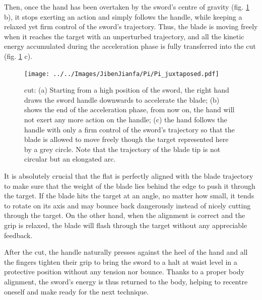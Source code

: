 Then, once the hand has been overtaken by the sword's centre of gravity (fig. \ref{fig:pi_cut} b), it stops exerting an action and simply follows the handle, while keeping a relaxed yet firm control of the sword's trajectory. Thus, the blade is moving freely when it reaches the target with an unperturbed trajectory, and all the kinetic energy accumulated during the acceleration phase is fully transferred into the cut (fig. \ref{fig:pi_cut} c).

\begin{figure}[ht]
\centering
	\texttt{[image: ../../Images/JibenJianfa/Pi/Pi\_juxtaposed.pdf]}
	\caption[\Pi{} cut]{\Pi{} cut: (a) Starting from a high position of the sword, the right hand draws the sword handle downwards to accelerate the blade; (b) shows the end of the acceleration phase, from now on, the hand will not exert any more action on the handle; (c) the hand follows the handle with only a firm control of the sword's trajectory so that the blade is allowed to move freely though the target represented here by a grey circle. Note that the trajectory of the blade tip is not circular but an elongated arc.}
	\label{fig:pi_cut}
\end{figure}

It is absolutely crucial that the flat is perfectly aligned with the blade trajectory to make sure that the weight of the blade lies behind the edge to push it through the target. If the blade hits the target at an angle, no matter how small, it tends to rotate on its axis and may bounce back dangerously instead of nicely cutting through the target. On the other hand, when the alignment is correct and the grip is relaxed, the blade will flash through the target without any appreciable feedback. 

After the cut, the handle naturally presses against the heel of the hand and all the fingers tighten their grip to bring the sword to a halt at waist level in a protective position without any tension nor bounce. Thanks to a proper body alignment, the sword's energy is thus returned to the body, helping to recentre oneself and make ready for the next technique.


